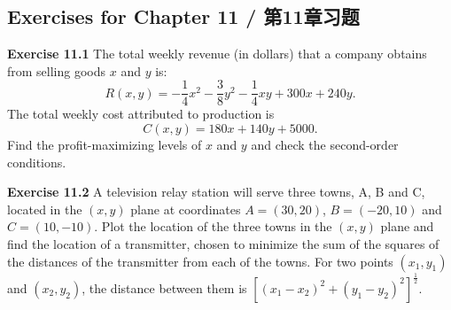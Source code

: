 \subsection*{Exercises for Chapter 11 / 第11章习题}

\begin{original}
\textbf{Exercise 11.1} The total weekly revenue (in dollars) that a company obtains from selling goods $x$ and $y$ is:
\[
R(x, y) = -\frac{1}{4}x^2 - \frac{3}{8}y^2 - \frac{1}{4}xy + 300x + 240y.
\]
The total weekly cost attributed to production is
\[
C(x, y) = 180x + 140y + 5000.
\]
Find the profit-maximizing levels of $x$ and $y$ and check the second-order conditions.

\textbf{Exercise 11.2} A television relay station will serve three towns, A, B and C, located in the $(x, y)$ plane at coordinates $A = (30,20)$, $B = (-20,10)$ and $C = (10,-10)$. Plot the location of the three towns in the $(x, y)$ plane and find the location of a transmitter, chosen to minimize the sum of the squares of the distances of the transmitter from each of the towns. For two points $(x_1, y_1)$ and $(x_2, y_2)$, the distance between them is $[(x_1 - x_2)^2 + (y_1 - y_2)^2]^{\frac{1}{2}}$.


\end{original}
